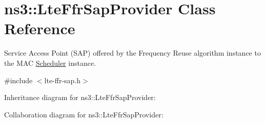 \hypertarget{classns3_1_1LteFfrSapProvider}{}\section{ns3\+:\+:Lte\+Ffr\+Sap\+Provider Class Reference}
\label{classns3_1_1LteFfrSapProvider}


Service Access Point (S\+AP) offered by the Frequency Reuse algorithm instance to the M\+AC \hyperlink{classns3_1_1Scheduler}{Scheduler} instance.  




{\ttfamily \#include $<$lte-\/ffr-\/sap.\+h$>$}



Inheritance diagram for ns3\+:\+:Lte\+Ffr\+Sap\+Provider\+:


Collaboration diagram for ns3\+:\+:Lte\+Ffr\+Sap\+Provider\+:

